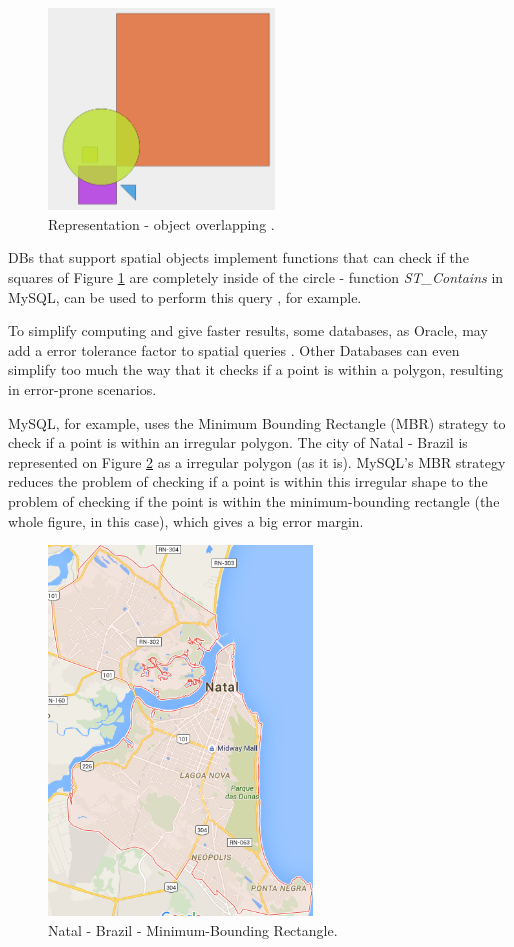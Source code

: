 \begin{figure}[ht!]
\centering
\includegraphics[width=60mm]{Imagens/objectOverLap.png}
\caption{Representation - object overlapping \cite{mysqlspatial}. \label{fig:objectoverlap}}
\end{figure}

DBs that support spatial objects implement functions that can check if the squares of Figure \ref{fig:objectoverlap} are completely inside of the circle - function  \textit{ST\_Contains} in MySQL, can be used to perform this query \cite{mysqlspatial}, for example. 

To simplify computing and give faster results, some databases, as Oracle, may add a error tolerance factor to spatial queries \cite{oracletolerance}. Other Databases  can even simplify too much the way that it checks if a point is within a polygon, resulting in error-prone scenarios. 

MySQL, for example, uses the Minimum Bounding Rectangle (MBR) strategy to check if a point is within an irregular polygon. The city of Natal - Brazil is represented on Figure \ref{fig:natalmbr} as a irregular polygon (as it is). MySQL's MBR strategy reduces the problem of checking if a point is within this irregular shape to the problem of checking if the point is within the minimum-bounding rectangle (the whole figure, in this case), which gives a big error margin.

\begin{figure}[ht!]
\centering
\includegraphics[width=70mm]{Imagens/natal.png}
\caption{Natal - Brazil - Minimum-Bounding Rectangle. \cite{gmapsnatal}~\label{fig:natalmbr}}
\end{figure}

